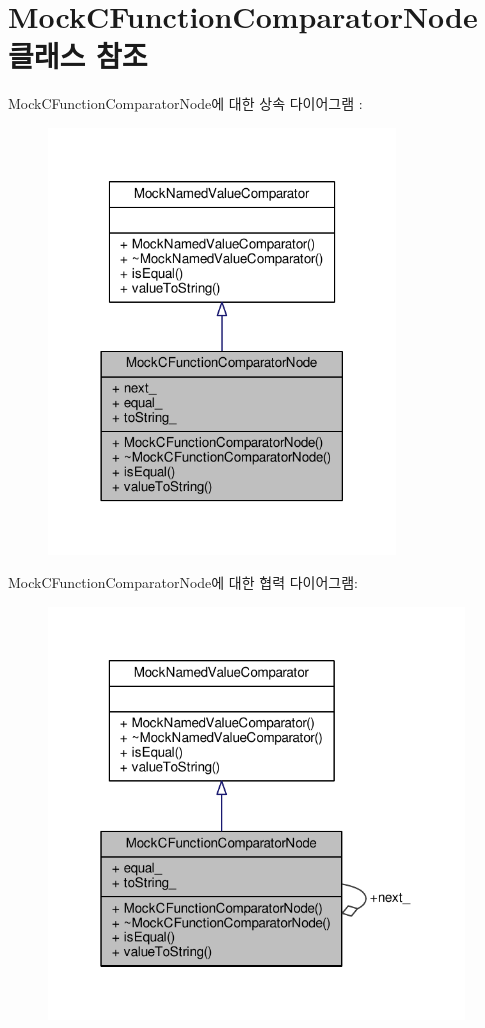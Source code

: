 \hypertarget{class_mock_c_function_comparator_node}{}\section{Mock\+C\+Function\+Comparator\+Node 클래스 참조}
\label{class_mock_c_function_comparator_node}


Mock\+C\+Function\+Comparator\+Node에 대한 상속 다이어그램 \+: 
\nopagebreak
\begin{figure}[H]
\begin{center}
\leavevmode
\includegraphics[width=261pt]{class_mock_c_function_comparator_node__inherit__graph}
\end{center}
\end{figure}


Mock\+C\+Function\+Comparator\+Node에 대한 협력 다이어그램\+:
\nopagebreak
\begin{figure}[H]
\begin{center}
\leavevmode
\includegraphics[width=313pt]{class_mock_c_function_comparator_node__coll__graph}
\end{center}
\end{figure}
